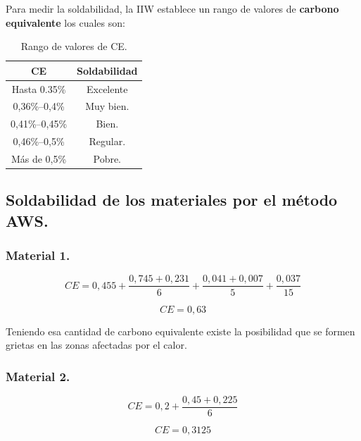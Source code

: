 \documentclass[12pt,a4paper]{article}
\begin{document}
Para medir la soldabilidad, la IIW establece un rango de valores de \textbf{carbono equivalente} los cuales son:

\begin{table}[h!]
    \centering
    \begin{tabular}{|c|c|}
        \hline
        \textbf{CE} & \textbf{Soldabilidad} \\ \hline
        Hasta 0.35\% & Excelente \\ \hline
        0,36\%--0,4\% & Muy bien. \\ \hline
        0,41\%--0,45\% & Bien. \\ \hline
        0,46\%--0,5\% & Regular. \\ \hline
        Más de 0,5\% & Pobre. \\ \hline
    \end{tabular}
    \caption{Rango de valores de CE.}
\end{table}

\subsection{Soldabilidad de los materiales por el método AWS.}

\subsubsection{Material 1.}

\begin{equation*}
    CE = 0,455 + \frac{0,745 + 0,231}{6} + \frac{0,041 + 0,007}{5} + \frac{0,037}{15}
\end{equation*}

\begin{equation*}
    CE = 0,63
\end{equation*}

Teniendo esa cantidad de carbono equivalente existe la posibilidad que se formen grietas en las zonas afectadas por el calor.

\subsubsection{Material 2.}

\begin{equation*}
    CE = 0,2 + \frac{0,45 + 0,225}{6} 
\end{equation*}

\begin{equation*}
    CE = 0,3125
\end{equation*}
\end{document}
